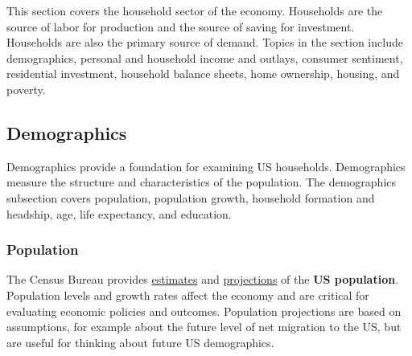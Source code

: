 \begin{minipage}{0.76\textwidth}
\small This section covers the household sector of the economy. Households are the source of labor for production and the source of saving for investment. Households are also the primary source of demand. Topics in the section include demographics, personal and household income and outlays, consumer sentiment, residential investment, household balance sheets, home ownership, housing, and poverty.

\hypertarget{hhdem}{\label{hhdem}}
\subsection*{Demographics} 

\small Demographics provide a foundation for examining US households. Demographics measure the structure and characteristics of the population. The demographics subsection covers population, population growth, household formation and headship, age, life expectancy, and education.

\subsubsection*{Population} 

\small The Census Bureau provides \href{https://www.census.gov/programs-surveys/popest.html}{estimates} and \href{https://www.census.gov/programs-surveys/popproj.html}{projections} of the \textbf{US population}. Population levels and growth rates affect the economy and are critical for evaluating economic policies and outcomes. Population projections are based on assumptions, for example about the future level of net migration to the US, but are useful for thinking about future US demographics.


\vspace{1mm}


\end{minipage}
